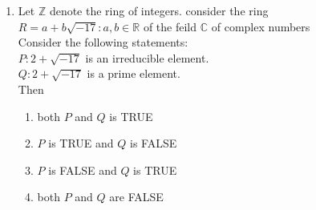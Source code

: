 \documentclass[journal]{IEEEtran}
\begin{document}
\begin{enumerate}
\item Let $\mathbb{Z}$ denote the ring of integers. consider the ring\\
$R={a+b\sqrt{-17}: a,b \in \mathbb{R}}$ of the feild $\mathbb{C}$ of complex numbers \\
Consider the following statements:\\
$P:2+\sqrt{-17}$ is an irreducible element.\\
$Q:2+\sqrt{-17}$ is a prime element.\\
Then
\begin{enumerate}
    \item both $P$ and $Q$ is TRUE
    \item $P$ is TRUE and $Q$ is FALSE
    \item $P$ is FALSE and $Q$ is TRUE
    \item both $P$ and $Q$ are FALSE
\end{enumerate}
\end{enumerate}
\end{document}
